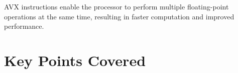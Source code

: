 AVX instructions enable the processor to perform multiple floating-point operations at the same time, resulting in faster computation and improved performance. \cite{Schuchart2016TheScale}



\section{Key Points Covered}
